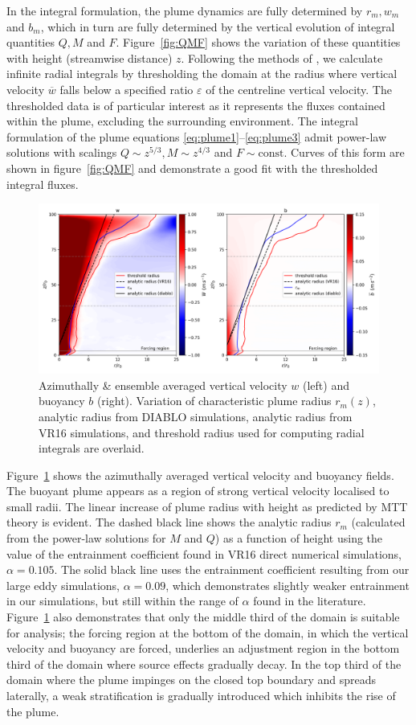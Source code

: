\documentclass[a4paper]{article}
\begin{document}
In the integral formulation, the plume dynamics are fully determined by $r_m, w_m$ and $b_m$, which in turn
are fully determined by the vertical evolution of integral quantities $Q, M$ and $F$. Figure~\ref{fig:QMF}
shows the variation of these quantities with height (streamwise distance) $z$. Following the methods of
\citet{craske}, we calculate infinite radial integrals by thresholding the domain at the radius where vertical
velocity $\overline{w}$ falls below a specified ratio $\varepsilon$ of the centreline vertical velocity. The
thresholded data is of particular interest as it represents the fluxes contained within the plume, excluding
the surrounding environment. The integral formulation of the plume equations
\eqref{eq:plume1}--\eqref{eq:plume3} admit power-law solutions with scalings $Q \sim z^{5/3}, M \sim z^{4/3}$
and $F \sim \text{const}$. Curves of this form are shown in figure~\ref{fig:QMF} and demonstrate a good fit
with the thresholded integral fluxes. 
\begin{figure}
	\centering
	\includegraphics[width=.8\textwidth]{mvr/fig7.png}
	\caption{Azimuthally \& ensemble averaged vertical velocity $w$ (left) and buoyancy $b$ (right). Variation
	of characteristic plume radius $r_m(z)$, analytic radius from DIABLO simulations, analytic radius from
	VR16 simulations, and threshold radius used for computing radial integrals are overlaid.}
	\label{fig:radius}
\end{figure}

Figure~\ref{fig:radius} shows the azimuthally averaged vertical velocity and buoyancy fields. The
buoyant plume appears as a region of strong vertical velocity localised to small radii. The linear increase
of plume radius with height as predicted by MTT theory is evident. The dashed black line shows the
analytic radius $r_m$ (calculated from the power-law solutions for $M$ and $Q$) as a function of height using
the value of the entrainment coefficient found in VR16 direct numerical simulations, $\alpha = 0.105$. The
solid black line uses the entrainment coefficient resulting from our large eddy simulations, $\alpha = 0.09$,
which demonstrates slightly weaker entrainment in our simulations, but still within the range of $\alpha$
found in the literature. Figure~\ref{fig:radius} also demonstrates that only the middle third of the domain is
suitable for analysis; the forcing region at the bottom of the domain, in which the vertical velocity and
buoyancy are forced, underlies an adjustment region in the bottom third of the domain where source effects
gradually decay.  In the top third of the domain where the plume impinges on the closed top boundary and
spreads laterally, a weak stratification is gradually introduced which inhibits the rise of the plume.
\end{document}
